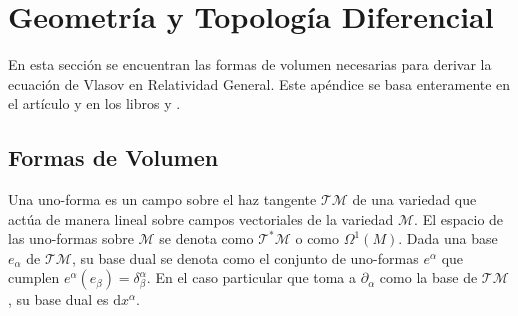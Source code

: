 \documentclass[11pt,twoside,openright,spanish]{report}
\numberwithin{equation}{chapter}
\numberwithin{figure}{chapter}
\numberwithin{table}{chapter}
\begin{document}
\chapter{Geometría y Topología Diferencial}\label{gytd}

\noindent
En esta sección se encuentran las formas de volumen necesarias para derivar la ecuación de Vlasov en Relatividad General. Este apéndice se basa enteramente en el artículo \citet{debbasch1} y en los libros \citet{boothbyaitdmarg} y \citet{spivakcm}.

\section{Formas de Volumen}
Una uno-forma es un campo sobre el haz tangente $\mathcal{TM}$ de una variedad que actúa de manera lineal sobre campos vectoriales de la variedad $\mathcal{M}$. El espacio de las uno-formas sobre $\mathcal{M}$ se denota como $\mathcal{T^*M}$ o como $\Omega^1(M)$. Dada una base $e_\alpha$ de $\mathcal{TM}$, su base dual se denota como el conjunto de uno-formas $e^\alpha$ que cumplen $e^\alpha\left(e_\beta\right)=\delta^\alpha_\beta$.  En el caso particular que toma a $\partial_\alpha$ como la base de $\mathcal{TM}$, su base dual es $\text{d}x^\alpha$.
\end{document}
